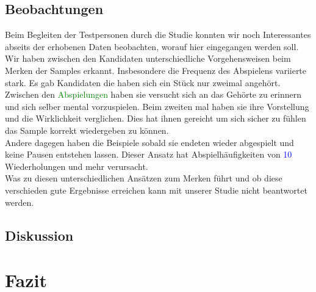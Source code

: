 \documentclass{acm_proc_article-sp}
\begin{document}
\subsection{Beobachtungen}
Beim Begleiten der Testpersonen durch die Studie konnten wir noch Interessantes abseits der erhobenen Daten beobachten, worauf hier eingegangen werden soll.\\
Wir haben zwischen den Kandidaten unterschiedliche Vorgehensweisen beim Merken der Samples erkannt. Insbesondere die Frequenz des Abspielens variierte stark. Es gab Kandidaten die haben sich ein Stück nur zweimal angehört. Zwischen den \textcolor{green}{Abspielungen} haben sie versucht sich an das Gehörte zu erinnern und sich selber mental vorzuspielen. Beim zweiten mal haben sie ihre Vorstellung und die Wirklichkeit verglichen. Dies hat ihnen gereicht um sich sicher zu fühlen das Sample korrekt wiedergeben zu können.\\
Andere dagegen haben die Beispiele sobald sie endeten wieder abgespielt und keine Pausen entstehen lassen. Dieser Ansatz hat Abspielhäufigkeiten von \textcolor{blue}{10} Wiederholungen und mehr verursacht.\\ 
Was zu diesen unterschiedlichen Ansätzen zum Merken führt und ob diese verschieden gute Ergebnisse erreichen kann mit unserer Studie nicht beantwortet werden.
\subsection{Diskussion}


\section{Fazit}
\printbibliography
\end{document}
